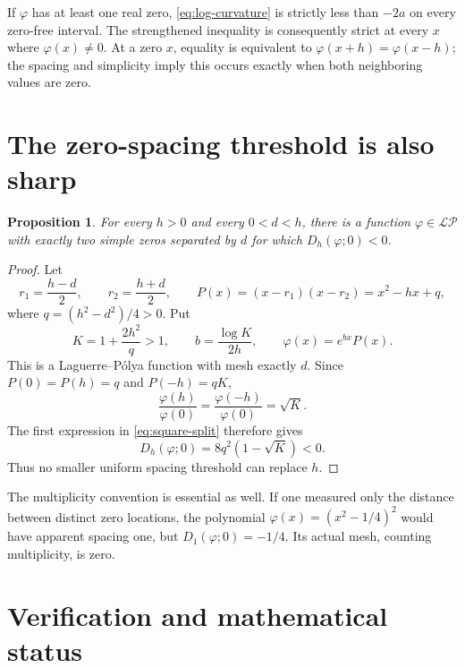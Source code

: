 \documentclass[11pt]{article}
\newtheorem{proposition}[theorem]{Proposition}
\theoremstyle{remark}\newtheorem{remark}[theorem]{Remark}
\newcommand{\LP}{\mathcal{LP}}
\begin{document}
If $\varphi$ has at least one real zero, \eqref{eq:log-curvature} is
strictly less than $-2a$ on every zero-free interval. The strengthened
inequality is consequently strict at every $x$ where $\varphi(x)\ne0$.
At a zero $x$, equality is equivalent to
$\varphi(x+h)=\varphi(x-h)$; the spacing and simplicity imply this occurs
exactly when both neighboring values are zero.

\section{The zero-spacing threshold is also sharp}

\begin{proposition}\label{prop:mesh-sharp}
For every $h>0$ and every $0<d<h$, there is a function
$\varphi\in\LP$ with exactly two simple zeros separated by $d$ for which
$D_h(\varphi;0)<0$.
\end{proposition}

\begin{proof}
Let
\[
 r_1=\frac{h-d}{2},\qquad r_2=\frac{h+d}{2},\qquad
 P(x)=(x-r_1)(x-r_2)=x^2-hx+q,
\]
where $q=(h^2-d^2)/4>0$. Put
\[
 K=1+\frac{2h^2}{q}>1,\qquad
 b=\frac{\log K}{2h},\qquad \varphi(x)=e^{bx}P(x).
\]
This is a Laguerre--P\'olya function with mesh exactly $d$.
Since $P(0)=P(h)=q$ and $P(-h)=qK$,
\[
 \frac{\varphi(h)}{\varphi(0)}
 =\frac{\varphi(-h)}{\varphi(0)}=\sqrt K.
\]
The first expression in \eqref{eq:square-split} therefore gives
\[
 D_h(\varphi;0)=8q^2(1-\sqrt K)<0.
\]
Thus no smaller uniform spacing threshold can replace $h$.
\end{proof}

The multiplicity convention is essential as well. If one measured only
the distance between distinct zero locations, the polynomial
$\varphi(x)=(x^2-1/4)^2$ would have apparent spacing one, but
$D_1(\varphi;0)=-1/4$. Its actual mesh, counting multiplicity, is zero.

\section{Verification and mathematical status}
\end{document}
